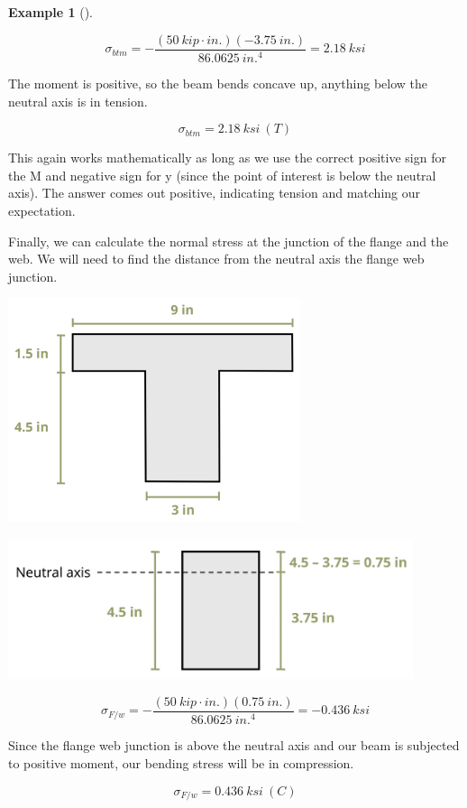 \documentclass[
  letterpaper,
  DIV=11,
  numbers=noendperiod]{scrreprt}
\theoremstyle{definition}
\newtheorem{example}{Example}[chapter]
\theoremstyle{remark}
\begin{document}
\begin{tcolorbox}
\begin{example}[]
\begin{tcolorbox}
\[
\sigma_{btm}=-\frac{(50{~kip}\cdot{in.})(-3.75{~in.})}{86.0625{~in.}^4}=2.18{~ksi}
\]

The moment is positive, so the beam bends concave up, anything below the
neutral axis is in tension.

\[
\sigma_{btm}=2.18{~ksi}~(T)
\]

This again works mathematically as long as we use the correct positive
sign for the M and negative sign for y (since the point of interest is
below the neutral axis). The answer comes out positive, indicating
tension and matching our expectation.

Finally, we can calculate the normal stress at the junction of the
flange and the web. We will need to find the distance from the neutral
axis the flange web junction.

\begin{center}
\includegraphics[width=3.375in,height=\textheight]{images/CH9 PNGs/Example 9.1 part 5.png}
\end{center}

\begin{center}
\includegraphics[width=4.67708in,height=\textheight]{images/CH9 PNGs/Example 9.1 part 6.png}
\end{center}

\[
\sigma_{F / w}=-\frac{(50{~kip}\cdot{in.})(0.75{~in.})}{86.0625{~in.}^4}=-0.436{~ksi}
\]

Since the flange web junction is above the neutral axis and our beam is
subjected to positive moment, our bending stress will be in compression.

\[
\sigma_{F/w}=0.436{~ksi}~(C)
\]

\end{tcolorbox}

\end{example}

\end{tcolorbox}
\end{document}
